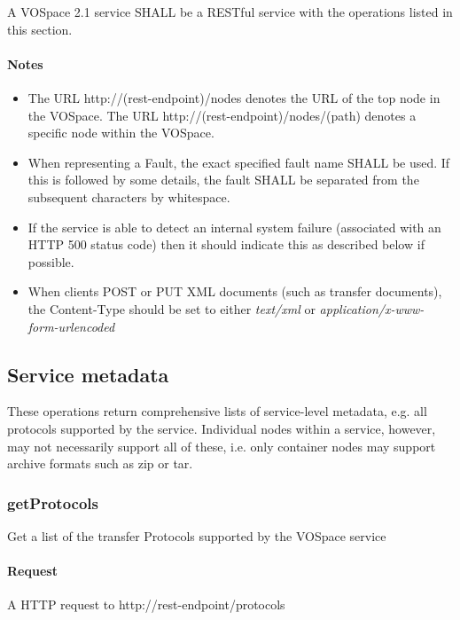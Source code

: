 \documentclass[11pt,a4paper]{ivoa}
\begin{document}
A VOSpace 2.1 service SHALL be a RESTful service with the operations listed in this section.

\paragraph{Notes}
\begin{itemize}
    \item The URL http://(rest-endpoint)/nodes denotes the URL of the top node in the VOSpace. The URL http://(rest-endpoint)/nodes/(path) denotes a specific node within the VOSpace.
    \item When representing a Fault, the exact specified fault name SHALL be used. If this is followed by some details, the fault SHALL be separated from the subsequent characters by whitespace.
    \item If the service is able to detect an internal system failure (associated with an HTTP 500 status code) then it should indicate this as described below if possible.
    \item When clients POST or PUT XML documents (such as transfer documents), the Content-Type should be set to either \emph{text/xml} or \emph{application/x-www-form-urlencoded}
\end{itemize}

\subsection{Service metadata}
\label{subsec:service metadata}
These operations return comprehensive lists of service-level metadata, e.g. all protocols supported by the service. Individual nodes within a service, however, may not necessarily support all of these, i.e. only container nodes may support archive formats such as zip or tar.

\subsubsection{getProtocols}
\label{subsubsec:getprotocols}
Get a list of the transfer Protocols supported by the VOSpace service

\paragraph{Request}
A HTTP request to http://rest-endpoint/protocols
\end{document}
